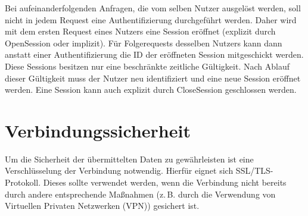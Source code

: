 Bei aufeinanderfolgenden Anfragen, die vom selben Nutzer ausgelöst werden, soll nicht in jedem Request eine Authentifizierung durchgeführt werden. Daher wird mit dem ersten Request eines Nutzers eine Session eröffnet (explizit durch OpenSession oder implizit). Für Folgerequests desselben Nutzers kann dann anstatt einer Authentifizierung die ID der eröffneten Session mitgeschickt werden. Diese Sessions besitzen nur eine beschränkte zeitliche Gültigkeit. Nach Ablauf dieser Gültigkeit muss der Nutzer neu identifiziert und eine neue Session eröffnet werden. Eine Session kann auch explizit durch CloseSession
geschlossen werden.

\section{Verbindungssicherheit}
Um die Sicherheit der übermittelten Daten zu gewährleisten ist eine Verschlüsselung der Verbindung notwendig. Hierfür eignet sich SSL/TLS-Protokoll. Dieses sollte verwendet werden, wenn die Verbindung nicht bereits durch andere entsprechende Maßnahmen (z.\,B. durch die Verwendung von Virtuellen Privaten Netzwerken (VPN)) gesichert ist.